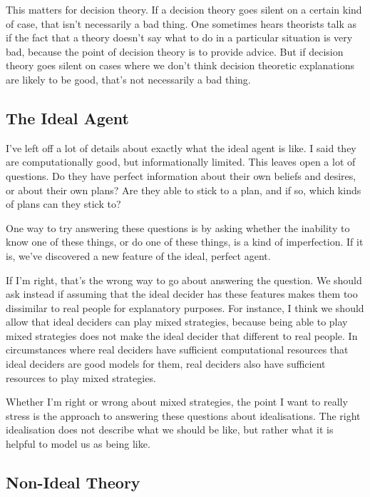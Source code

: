 \documentclass[
  11pt,
  letterpaper,
  DIV=11,
  numbers=noendperiod,
  twoside]{scrartcl}
\begin{document}
This matters for decision theory. If a decision theory goes silent on a
certain kind of case, that isn't necessarily a bad thing. One sometimes
hears theorists talk as if the fact that a theory doesn't say what to do
in a particular situation is very bad, because the point of decision
theory is to provide advice. But if decision theory goes silent on cases
where we don't think decision theoretic explanations are likely to be
good, that's not necessarily a bad thing.

\subsection{The Ideal Agent}\label{the-ideal-agent}

I've left off a lot of details about exactly what the ideal agent is
like. I said they are computationally good, but informationally limited.
This leaves open a lot of questions. Do they have perfect information
about their own beliefs and desires, or about their own plans? Are they
able to stick to a plan, and if so, which kinds of plans can they stick
to?

One way to try answering these questions is by asking whether the
inability to know one of these things, or do one of these things, is a
kind of imperfection. If it is, we've discovered a new feature of the
ideal, perfect agent.

If I'm right, that's the wrong way to go about answering the question.
We should ask instead if assuming that the ideal decider has these
features makes them too dissimilar to real people for explanatory
purposes. For instance, I think we should allow that ideal deciders can
play mixed strategies, because being able to play mixed strategies does
not make the ideal decider that different to real people. In
circumstances where real deciders have sufficient computational
resources that ideal deciders are good models for them, real deciders
also have sufficient resources to play mixed strategies.

Whether I'm right or wrong about mixed strategies, the point I want to
really stress is the approach to answering these questions about
idealisations. The right idealisation does not describe what we should
be like, but rather what it is helpful to model us as being like.

\subsection{Non-Ideal Theory}\label{non-ideal-theory}
\end{document}

